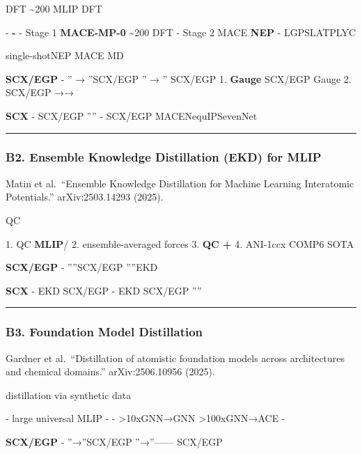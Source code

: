 \documentclass[
  12pt,
]{article}
\begin{document}
\textbf{}  DFT \textasciitilde200
 MLIP DFT


\textbf{} - \textbf{-} - Stage
1 \textbf{MACE-MP-0} 
\textasciitilde200  DFT  - Stage 2
MACE  \textbf{NEP}  -
LGPSLATPLYC

\textbf{} single-shotNEP
 MACE MD 

\textbf{ SCX/EGP } - \textbf{} ''
→ ''SCX/EGP '' →
'' SCX/EGP  1. \textbf{Gauge
} SCX/EGP  Gauge
 2.
\textbf{} SCX/EGP
→→

\textbf{SCX } - SCX/EGP
'''' - SCX/EGP
MACENequIPSevenNet


\begin{center}\rule{0.5\linewidth}{0.5pt}\end{center}

\subsubsection{B2. Ensemble Knowledge Distillation (EKD) for
MLIP}\label{b2.-ensemble-knowledge-distillation-ekd-for-mlip}

\textbf{} Matin et al.~``Ensemble Knowledge Distillation for
Machine Learning Interatomic Potentials.'' arXiv:2503.14293 (2025).

\textbf{}  QC


\textbf{} 1.  QC  \textbf{
MLIP}/ 2.
\textbf{}ensemble-averaged forces
3.  \textbf{QC  + } 4.  ANI-1ccx
 COMP6  SOTA

\textbf{ SCX/EGP } - \textbf{}
''''SCX/EGP
''''EKD


\textbf{SCX } - EKD SCX/EGP
 - EKD
SCX/EGP
''''

\begin{center}\rule{0.5\linewidth}{0.5pt}\end{center}

\subsubsection{B3. Foundation Model
Distillation}\label{b3.-foundation-model-distillation}

\textbf{} Gardner et al.~``Distillation of atomistic foundation
models across architectures and chemical domains.'' arXiv:2506.10956
(2025).

\textbf{} distillation via synthetic
data

\textbf{} - large universal MLIP -
 -  \textgreater10xGNN→GNN
\textgreater100xGNN→ACE -


\textbf{ SCX/EGP } - \textbf{}
''→''SCX/EGP
''→''------
SCX/EGP 
\end{document}
